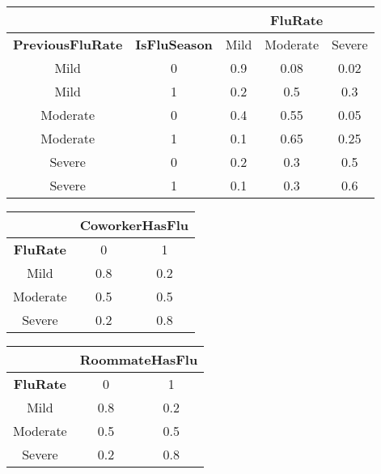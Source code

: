 \documentclass[12pt]{article}
\begin{document}
\begin{center}
\begin{tabular}{|c|c|c|c|c|}
\hline 
\multicolumn{2}{|c|}{} & \multicolumn{3}{|c|}{\textbf{FluRate}} \\ 
\hline 
\textbf{PreviousFluRate} & \textbf{IsFluSeason} & Mild & Moderate & Severe \\ 
\hline 
Mild & 0 & 0.9 & 0.08 & 0.02 \\ 
\hline 
Mild & 1 & 0.2 & 0.5 & 0.3 \\ 
\hline 
Moderate & 0 & 0.4 & 0.55 & 0.05 \\ 
\hline 
Moderate & 1 & 0.1 & 0.65 & 0.25 \\ 
\hline 
Severe & 0 & 0.2 & 0.3 & 0.5 \\ 
\hline 
Severe & 1 & 0.1 & 0.3 & 0.6 \\ 
\hline 
\end{tabular} 
\end{center}

\begin{center}
\begin{tabular}{|c|c|c|}
\hline 
 & \multicolumn{2}{|c|}{\textbf{CoworkerHasFlu}} \\ 
\hline 
\textbf{FluRate} & 0 & 1 \\ 
\hline 
Mild & 0.8 & 0.2 \\ 
\hline 
Moderate & 0.5 & 0.5 \\ 
\hline 
Severe & 0.2 & 0.8 \\ 
\hline 
\end{tabular} 
\end{center}

\begin{center}
\begin{tabular}{|c|c|c|}
\hline 
 & \multicolumn{2}{|c|}{\textbf{RoommateHasFlu}} \\ 
\hline 
\textbf{FluRate} & 0 & 1 \\ 
\hline 
Mild & 0.8 & 0.2 \\ 
\hline 
Moderate & 0.5 & 0.5 \\ 
\hline 
Severe & 0.2 & 0.8 \\ 
\hline 
\end{tabular}
\end{center} 
\end{document}
